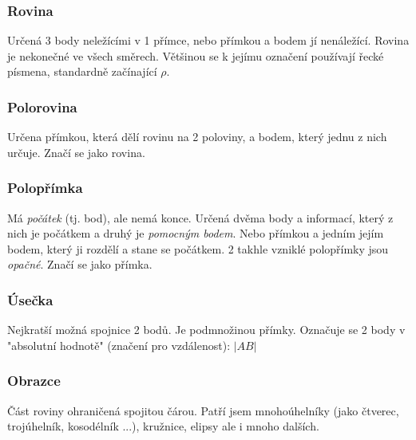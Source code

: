 \documentclass[12pt]{article}
\begin{document}
\subsubsection{Rovina}
Určená 3 body neležícími v 1 přímce, nebo přímkou a bodem jí nenáležící. Rovina je nekonečné ve všech směrech. Většinou se k jejímu označení používají řecké písmena, standardně začínající $\rho$.
\subsubsection{Polorovina}
Určena přímkou, která dělí rovinu na 2 poloviny, a bodem, který jednu z nich určuje. Značí se jako rovina.
\subsubsection{Polopřímka}
Má \emph{počátek} (tj. bod), ale nemá konce. Určená dvěma body a informací, který z nich je počátkem a druhý je \emph{pomocným bodem}. Nebo přímkou a jedním jejím bodem, který ji rozdělí a stane se počátkem. 2 takhle vzniklé polopřímky jsou \emph{opačné}. Značí se jako přímka.
\subsubsection{Úsečka}
Nejkratší možná spojnice 2 bodů. Je podmnožinou přímky. Označuje se 2 body v  "absolutní hodnotě" (značení pro vzdálenost): $|AB|$
\subsubsection{Obrazce}
Část roviny ohraničená spojitou čárou. Patří jsem mnohoúhelníky (jako čtverec, trojúhelník, kosodélník ...), kružnice, elipsy ale i mnoho dalších.
\end{document}
